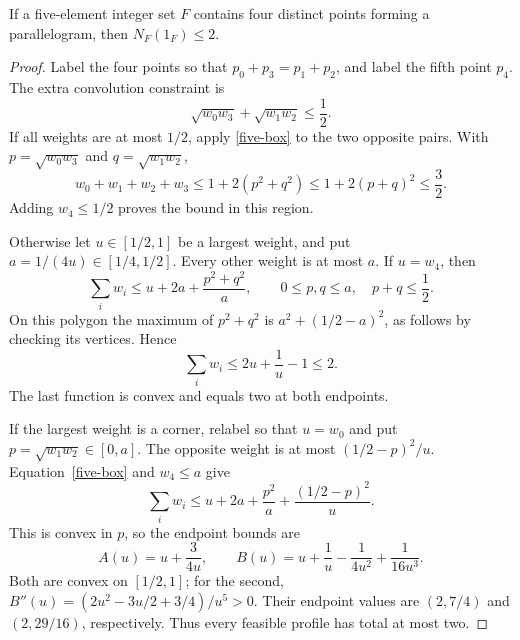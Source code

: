 \begin{lemma}\label{five-parallelogram}
If a five-element integer set $F$ contains four distinct points forming a
parallelogram, then $N_F(1_F)\le2$.
\end{lemma}
\begin{proof}
Label the four points so that $p_0+p_3=p_1+p_2$, and label the fifth
point $p_4$. The extra convolution constraint is
\[
 \sqrt{w_0w_3}+\sqrt{w_1w_2}\le\frac12.
\]
If all weights are at most $1/2$, apply \eqref{five-box} to the two
opposite pairs. With $p=\sqrt{w_0w_3}$ and $q=\sqrt{w_1w_2}$,
\[
 w_0+w_1+w_2+w_3\le1+2(p^2+q^2)
 \le1+2(p+q)^2\le\frac32.
\]
Adding $w_4\le1/2$ proves the bound in this region.

Otherwise let $u\in[1/2,1]$ be a largest weight, and put
$a=1/(4u)\in[1/4,1/2]$. Every other weight is at most $a$.
If $u=w_4$, then
\[
 \sum_iw_i\le u+2a+\frac{p^2+q^2}{a},
 \qquad 0\le p,q\le a,\quad p+q\le\frac12.
\]
On this polygon the maximum of $p^2+q^2$ is
$a^2+(1/2-a)^2$, as follows by checking its vertices. Hence
\[
 \sum_iw_i\le2u+\frac1u-1\le2.
\]
The last function is convex and equals two at both endpoints.

If the largest weight is a corner, relabel so that $u=w_0$ and put
$p=\sqrt{w_1w_2}\in[0,a]$. The opposite weight is at most
$(1/2-p)^2/u$. Equation~\eqref{five-box} and $w_4\le a$ give
\[
 \sum_iw_i\le u+2a+\frac{p^2}{a}+\frac{(1/2-p)^2}{u}.
\]
This is convex in $p$, so the endpoint bounds are
\[
 A(u)=u+\frac{3}{4u},\qquad
 B(u)=u+\frac1u-\frac1{4u^2}+\frac1{16u^3}.
\]
Both are convex on $[1/2,1]$; for the second,
$B''(u)=(2u^2-3u/2+3/4)/u^5>0$.
Their endpoint values are $(2,7/4)$ and $(2,29/16)$, respectively.
Thus every feasible profile has total at most two.
\end{proof}

